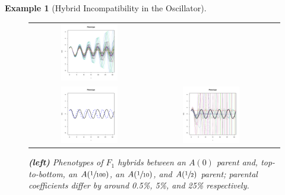 \documentclass{article}
\newcommand{\1}{\mathbbm{1}}
\newtheorem{example}{Example}
\begin{document}
\begin{example}[Hybrid Incompatibility in the Oscillator]
\begin{figure}[H]
\begin{tabular}{ccc}
      \includegraphics[width=0.5\textwidth, height=0.125\paperheight]{examples/osc_F2_tenthtau0.pdf} \\
      \includegraphics[width=0.5\textwidth, height=0.125\paperheight]{examples/osc_F1_half_tau0.pdf} &
      \includegraphics[width=0.5\textwidth, height=0.125\paperheight]{examples/osc_F2_halftau0.pdf}
  \end{tabular}
  \caption{
    \textbf{(left)} Phenotypes of $F_1$ hybrids between an $A(0)$ parent and, top-to-bottom, an $A(\sfrac{1}{100})$, an $A(\sfrac{1}{10})$, and $A(\sfrac{1}{2})$ parent;
    parental coefficients differ by around 0.5\%, 5\%, and 25\% respectively.
}
\end{figure}
\end{example}
\end{document}
